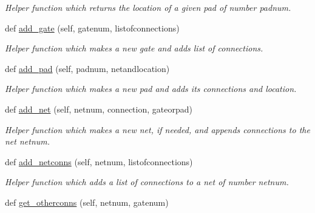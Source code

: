 \begin{DoxyCompactItemize}
\begin{DoxyCompactList}\small\item\em Helper function which returns the location of a given pad of number \textquotesingle{}padnum\textquotesingle{}. \end{DoxyCompactList}\item 
def \hyperlink{classgqp__placer_1_1mothercore_a179455b7cde50fb0c8ff3dd35be55ca1}{add\+\_\+gate} (self, gatenum, listofconnections)\hypertarget{classgqp__placer_1_1mothercore_a179455b7cde50fb0c8ff3dd35be55ca1}{}\label{classgqp__placer_1_1mothercore_a179455b7cde50fb0c8ff3dd35be55ca1}

\begin{DoxyCompactList}\small\item\em Helper function which makes a new gate and adds list of connections. \end{DoxyCompactList}\item 
def \hyperlink{classgqp__placer_1_1mothercore_aa4899f06601a4a1e19b3e5bce4f99bfc}{add\+\_\+pad} (self, padnum, netandlocation)\hypertarget{classgqp__placer_1_1mothercore_aa4899f06601a4a1e19b3e5bce4f99bfc}{}\label{classgqp__placer_1_1mothercore_aa4899f06601a4a1e19b3e5bce4f99bfc}

\begin{DoxyCompactList}\small\item\em Helper function which makes a new pad and adds its connections and location. \end{DoxyCompactList}\item 
def \hyperlink{classgqp__placer_1_1mothercore_a0bcf31558757a0edd15a586468715378}{add\+\_\+net} (self, netnum, connection, gateorpad)\hypertarget{classgqp__placer_1_1mothercore_a0bcf31558757a0edd15a586468715378}{}\label{classgqp__placer_1_1mothercore_a0bcf31558757a0edd15a586468715378}

\begin{DoxyCompactList}\small\item\em Helper function which makes a new net, if needed, and appends connections to the net \textquotesingle{}netnum\textquotesingle{}. \end{DoxyCompactList}\item 
def \hyperlink{classgqp__placer_1_1mothercore_aff93e1055cd53093faf6ec7e743f8433}{add\+\_\+netconns} (self, netnum, listofconnections)\hypertarget{classgqp__placer_1_1mothercore_aff93e1055cd53093faf6ec7e743f8433}{}\label{classgqp__placer_1_1mothercore_aff93e1055cd53093faf6ec7e743f8433}

\begin{DoxyCompactList}\small\item\em Helper function which adds a list of connections to a net of number \textquotesingle{}netnum\textquotesingle{}. \end{DoxyCompactList}\item 
def \hyperlink{classgqp__placer_1_1mothercore_a8ca67285ee77dac596b73128c9b655af}{get\+\_\+otherconns} (self, netnum, gatenum)\hypertarget{classgqp__placer_1_1mothercore_a8ca67285ee77dac596b73128c9b655af}{}\label{classgqp__placer_1_1mothercore_a8ca67285ee77dac596b73128c9b655af}


\end{DoxyCompactItemize}
